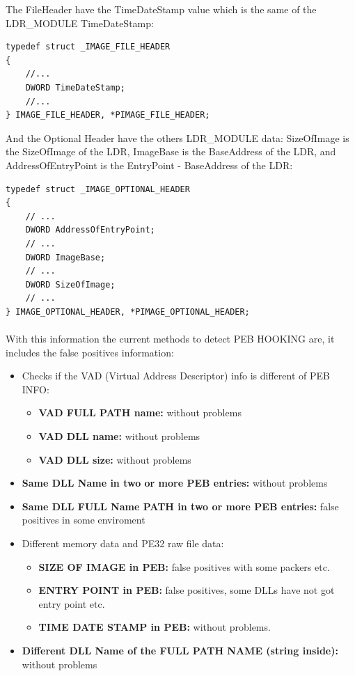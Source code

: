\documentclass[12pt,a4paper,english]{book}
\newcommand{\paraph}{\paragraph{}}
\begin{document}
The FileHeader have the TimeDateStamp value which is the same of the LDR\_MODULE TimeDateStamp:
\lstset{language=C,caption=IMAGE\_FILE\_HEADER structure}
\begin{lstlisting}
typedef struct _IMAGE_FILE_HEADER
{
    //...
    DWORD TimeDateStamp;
    //...
} IMAGE_FILE_HEADER, *PIMAGE_FILE_HEADER;
\end{lstlisting}

And the Optional Header have the others LDR\_MODULE data: SizeOfImage is the SizeOfImage of the LDR, ImageBase is the BaseAddress of the LDR, and AddressOfEntryPoint is the EntryPoint - BaseAddress of the LDR:
\lstset{language=C,caption=IMAGE\_OPTIONAL\_HEADER structure}
\begin{lstlisting}
typedef struct _IMAGE_OPTIONAL_HEADER
{
    // ...
    DWORD AddressOfEntryPoint;
    // ...
    DWORD ImageBase;
    // ...
    DWORD SizeOfImage;
    // ...
} IMAGE_OPTIONAL_HEADER, *PIMAGE_OPTIONAL_HEADER;
\end{lstlisting}

\paraph{}
With this information the current methods to detect PEB HOOKING are, it includes the false positives information:

\begin{itemize}
\item { Checks if the VAD (Virtual Address Descriptor) info is different of PEB INFO:
\begin{itemize}
\item { {\bf VAD FULL PATH name:} without problems }
\item { {\bf VAD DLL name:} without problems }
\item { {\bf VAD DLL size:} without problems }
\end{itemize}
}
\item { {\bf Same DLL Name in two or more PEB entries:} without problems }
\item { {\bf Same DLL FULL Name PATH in two or more PEB entries:} false positives in some enviroment }
\item { Different memory data and PE32 raw file data:
\begin{itemize}
\item { {\bf SIZE OF IMAGE in PEB:} false positives with some packers etc. }
\item { {\bf ENTRY POINT in PEB:} false positives, some DLLs have not got entry point etc. }
\item { {\bf TIME DATE STAMP in PEB:} without problems. }
\end{itemize}
}
\item { {\bf Different DLL Name of the FULL PATH NAME (string inside):} without problems }
\end{itemize}
\end{document}
